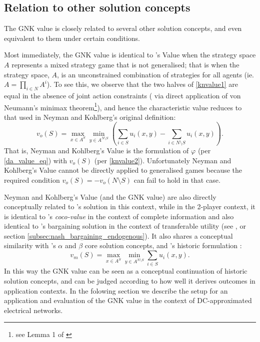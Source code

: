 \subsection{Relation to other solution concepts}\label{relating_to_the_old}

The GNK value is closely related to several other solution concepts, and even equivalent to them under certain conditions.

Most immediately, the GNK value is identical to \cite{value2}'s Value when the strategy space $A$ represents a mixed strategy game that is not generalised; that is when the strategy space, $A$, is an unconstrained combination of strategies for all agents (ie. $A = \prod_{i\in N}A^i$).
To see this, we observe that the two halves of \eqref{knvalue1} are equal in the absence of joint action constraints (%
via direct application of von Neumann's minimax theorem\footnote{see Lemma 1 of \cite{value2}}), 
and hence the characteristic value reduces to that used in Neyman and Kohlberg's original definition:
\begin{equation}\label{knvalue2}v_o(S) = \max_{x\in A^S}\min_{y\in A^{N\setminus S}} \left(\sum_{i\in S} u_i(x,y) - \sum_{i\in N\setminus S} u_i(x,y) \right).\end{equation}
%
That is, Neyman and Kohlberg's Value is the formulation of $\varphi$ (per \eqref{da_value_eq}) 
with $v_o(S)$ (per \eqref{knvalue2}).
Unfortunately Neyman and Kohlberg's Value cannot be directly applied to generalised games because the required condition $v_o(S)=-v_o(N\setminus S)$ can fail to hold in that case. 

Neyman and Kohlberg's Value (and the GNK value) are also directly conceptually related to \cite{values3}'s solution in this context,
while in the 2-player context, it is identical to \cite{kalai1,Kalai2010}'s \textit{coco-value} in the context of complete information  
and also identical to \cite{nash2}'s bargaining solution in the context of transferable utility (see \cite{value2}, or section \ref{subsec:nash_bargaining_endogenous}).
It also shares a conceptual similarity with \cite{aumann1961core}'s $\alpha$ and $\beta$ core solution concepts, and \cite{1944}'s historic formulation :
\begin{equation}\label{knvalue3}v_m(S) = \max_{x\in A^S}\min_{y\in A^{N\setminus S}} \sum_{i\in S} u_i(x,y).\end{equation}
In this way the GNK value can be seen as a conceptual continuation of historic solution concepts, and can be judged according to how well it derives outcomes in application contexts.
In the folowing section we describe the setup for an application and evaluation of the GNK value in the context of DC-approximated electrical networks.


